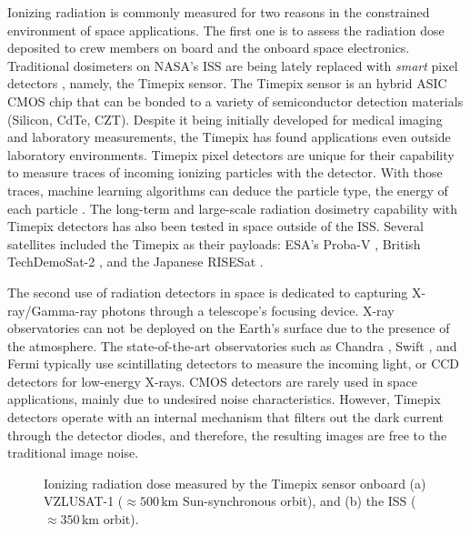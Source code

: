 \documentclass[a4paper,11pt,twoside,openright]{book}
\begin{document}
Ionizing radiation is commonly measured for two reasons in the constrained environment of space applications.
The first one is to assess the radiation dose deposited to crew members on board and the onboard space electronics.
Traditional dosimeters on NASA's \ac{ISS} are being lately replaced with \emph{smart} pixel detectors \cite{turecek2011small, stoffle2015timepix, pinsky2019timepix}, namely, the Timepix sensor.
The Timepix sensor \cite{llopart2007timepix, poikela2014timepix3} is an hybrid \ac{ASIC} \ac{CMOS} chip that can be bonded to a variety of semiconductor detection materials (Silicon, \acs{CdTe}, \ac{CZT}).
Despite it being initially developed for medical imaging \cite{ballabriga2018asic} and laboratory measurements, the Timepix has found applications even outside laboratory environments.
Timepix pixel detectors are unique for their capability to measure traces of incoming ionizing particles with the detector.
With those traces, machine learning algorithms can deduce the particle type, the energy of each particle \cite{granja2018resolving, baca2019timepix}.
The long-term and large-scale radiation dosimetry capability with Timepix detectors has also been tested in space outside of the \ac{ISS}.
Several satellites included the Timepix as their payloads: ESA's Proba-V \cite{granja2014directional, granja2016satram}, British TechDemoSat-2 \cite{furnell2018first}, and the Japanese RISESat \cite{filgas2019risepix}.

The second use of radiation detectors in space is dedicated to capturing X-ray/Gamma-ray photons through a telescope's focusing device.
X-ray observatories can not be deployed on the Earth's surface due to the presence of the atmosphere.
The state-of-the-art observatories such as Chandra \cite{weisskopf2000chandra}, Swift \cite{gehrels2004swift}, and Fermi \cite{atwood2009large} typically use scintillating detectors to measure the incoming light, or \ac{CCD} detectors for low-energy X-rays.
\ac{CMOS} detectors are rarely used in space applications, mainly due to undesired noise characteristics.
However, Timepix detectors operate with an internal mechanism that filters out the dark current through the detector diodes, and therefore, the resulting images are free to the traditional image noise.


\begin{figure}[!h]
  \centering
  \caption{Ionizing radiation dose measured by the Timepix sensor onboard (a) VZLUSAT-1 ($\approx 500$\,km Sun-synchronous orbit), and (b) the \acl{ISS} ($\approx 350$\,km orbit).}
  \label{fig:intro_radiation_maps}
\end{figure}
\end{document}
